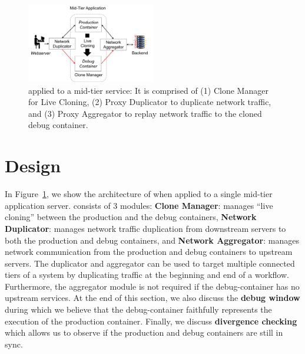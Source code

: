 
\begin{figure}[ht]
	\begin{center}
		\includegraphics[width=0.5\textwidth]{figs/arch.png}
		\caption{\parikshan applied to a mid-tier service: It is comprised of (1) Clone Manager for Live Cloning, (2) Proxy Duplicator to duplicate network traffic, and (3) Proxy Aggregator to replay network traffic to the cloned debug container.}
		\label{fig:workflow}
	\end{center}
\end{figure}

\section{Design}
\label{sec:design}

In Figure~\ref{fig:workflow}, we show the architecture of \parikshan when applied to a single mid-tier application server.
\parikshan consists of 3 modules: 
\textbf{Clone Manager}: manages ``live cloning'' between the production and the debug containers, 
\textbf{Network Duplicator}: manages network traffic duplication from downstream servers to both the production and debug containers, 
and \textbf{Network Aggregator}: manages network communication from the production and debug containers to upstream servers.
The duplicator and aggregator can be used to target multiple connected tiers of a system by duplicating traffic at the beginning and end of a workflow.
Furthermore, the aggregator module is not required if the debug-container has no upstream services. 
At the end of this section, we also discuss the \textbf{debug window} during which we believe that the debug-container faithfully represents the execution of the production container.
Finally, we discuss \textbf{divergence checking} which allows us to observe if the production and debug containers are still in sync.








